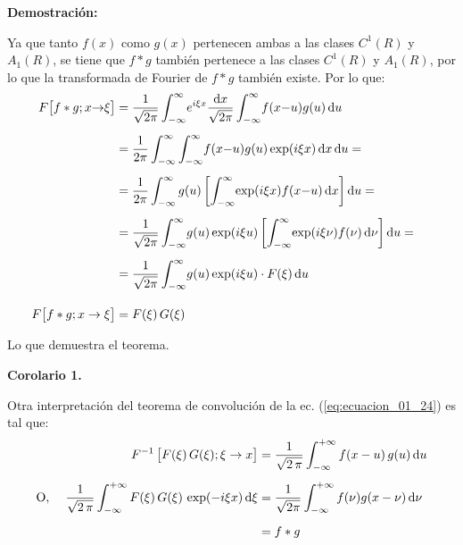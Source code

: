 \textbf{Demostración: }

Ya que tanto $f(x)$ como $g(x)$ pertenecen ambas a las clases $C^{1}(R)$ y $A_{1}(R)$, se tiene que $f * g$ también pertenece a las clases $C^{1}(R)$ y $A_{1}(R)$, por lo que la transformada de Fourier de $f * g$ también existe. Por lo que:
\begin{align}
\hspace*{-0.5cm}
\begin{aligned}[b]
F \big[f * g; x {\to} \xi \big] &= \dfrac{1}{\sqrt{2 \pi}} \int_{-\infty}^{\infty} \! e^{i  \xi x} \dfrac{\dd{x}}{\sqrt{2 \pi}} \int_{-\infty}^{\infty} \! f(x {-} u) g(u) \dd{u} \\[0.5em]
&= \dfrac{1}{2 \pi} \int_{-\infty}^{\infty} \int_{-\infty}^{\infty} \! f(x {-} u) g(u) \exp(i \xi x) \dd{x} \dd{u} = \\[0.5em]
&= \dfrac{1}{2 \pi} \int_{-\infty}^{\infty} g(u) \left[ \int_{-\infty}^{\infty} \! \exp(i \xi x) f(x {-} u) \dd{x} \right] \dd{u} = \\[0.5em]
&= \dfrac{1}{\sqrt{2  \pi}} \int_{-\infty}^{\infty} \! g(u) \exp(i \xi u) \left[ \int_{-\infty}^{\infty} \! \exp(i \xi \nu) f(\nu) \dd{\nu} \right] \dd{u} = \\[0.5em]
&= \dfrac{1}{\sqrt{2 \pi}} \int_{-\infty}^{\infty} \! g(u) \exp(i  \xi u) \cdot F(\xi) \dd{u} \\[1em]
F \big[f * g; x \to \xi \big] &= F(\xi) \, G(\xi)
\end{aligned}
\label{eq:ecuacion_01_24}
\end{align}

Lo que demuestra el teorema.
\\
\bigskip

\textbf{Corolario 1.}

Otra interpretación del teorema de convolución de la ec. (\ref{eq:ecuacion_01_24}) es tal que:
\begin{align}
\begin{aligned}[b]
F^{-1} \, \big[F(\xi) \, G(\xi); \xi \to x\big] &= \dfrac{1}{\sqrt{2 \, \pi}} \int_{-\infty}^{+\infty} f(x - u) \, g(u) \dd{u} \\[0.5em]
\mbox{O}, \hspace{0.4cm} \dfrac{1}{\sqrt{2 \, \pi}} \int_{-\infty}^{+\infty} F(\xi) \, G(\xi) \, \exp(- i \xi x) \dd{\xi} &= \dfrac{1}{\sqrt{2 \pi}} \int_{-\infty}^{+\infty} f(\nu) g(x - \nu) \dd{\nu} \\[0.5em]
&= f * g
\end{aligned}
\label{eq:ecuacion_01_25}
\end{align}

